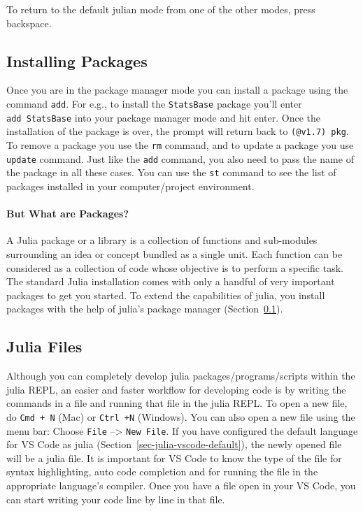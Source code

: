 \documentclass[
  letterpaper,
]{book}
\let\oldparagraph\paragraph
\renewcommand{\paragraph}[1]{\oldparagraph{#1}\mbox{}}
\begin{document}
To return to the default julian mode from one of the other modes, press
backspace.

\hypertarget{sec-install-package}{%
\subsection{Installing Packages}\label{sec-install-package}}

Once you are in the package manager mode you can install a package using
the command \texttt{add}. For e.g., to install the \texttt{StatsBase}
package you'll enter \texttt{add\ StatsBase} into your package manager
mode and hit enter. Once the installation of the package is over, the
prompt will return back to \texttt{(@v1.7)\ pkg}. To remove a package
you use the \texttt{rm} command, and to update a package you use
\texttt{update} command. Just like the \texttt{add} command, you also
need to pass the name of the package in all these cases. You can use the
\texttt{st} command to see the list of packages installed in your
computer/project environment.

\hypertarget{but-what-are-packages}{%
\paragraph{But What are Packages?}\label{but-what-are-packages}}

A Julia package or a library is a collection of functions and
sub-modules surrounding an idea or concept bundled as a single unit.
Each function can be considered as a collection of code whose objective
is to perform a specific task. The standard Julia installation comes
with only a handful of very important packages to get you started. To
extend the capabilities of julia, you install packages with the help of
julia's package manager (Section~\ref{sec-install-package}).

\hypertarget{sec-julia-files}{%
\subsection{Julia Files}\label{sec-julia-files}}

Although you can completely develop julia packages/programs/scripts
within the julia REPL, an easier and faster workflow for developing code
is by writing the commands in a file and running that file in the julia
REPL. To open a new file, do \texttt{Cmd\ +\ N} (Mac) or
\texttt{Ctrl\ +N} (Windows). You can also open a new file using the menu
bar: Choose \texttt{File} --\textgreater{} \texttt{New\ File}. If you
have configured the default language for VS Code as julia
(Section~\ref{sec-julia-vscode-default}), the newly opened file will be
a julia file. It is important for VS Code to know the type of the file
for syntax highlighting, auto code completion and for running the file
in the appropriate language's compiler. Once you have a file open in
your VS Code, you can start writing your code line by line in that file.
\end{document}
